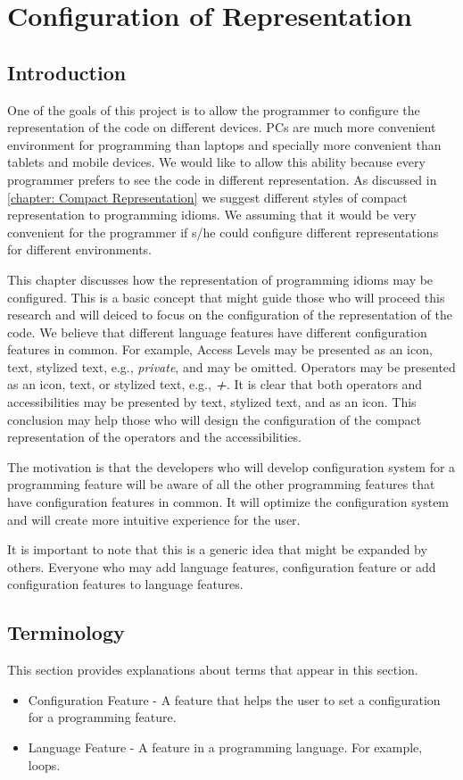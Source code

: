 \chapter{Configuration of Representation} \label{chapter:Configuration of Representation}
\section{Introduction}
One of the goals of this project is to allow the programmer to configure the representation of the code on different devices. PCs are much more convenient environment for programming than laptops and specially more convenient than tablets and mobile devices. We would like to allow this ability because every programmer prefers to see the code in different representation. As discussed in \autoref{chapter: Compact Representation} we suggest different styles of compact representation to programming idioms. We assuming that it would be very convenient for the programmer if s/he could configure different representations for different environments.

This chapter discusses how the representation of programming idioms may be configured. This is a basic concept that might guide those who will proceed this research and will deiced to focus on the configuration of the representation of the code. We believe that different language features have different configuration features in common. For example, Access Levels may be presented as an icon, text, stylized text, e.g., \textit{private}, and may be omitted. Operators may be presented as an icon, text, or stylized text, e.g., \textbf{\textit{+}}. It is clear that both operators and accessibilities may be presented by text, stylized text, and as an icon. This conclusion may help those who will design the configuration of the compact representation of the operators and the accessibilities. 

The motivation is that the developers who will develop configuration system for a programming feature will be aware of all the other programming features that have configuration features in common. It will optimize the configuration system and will create more intuitive experience for the user.

It is important to note that this is a generic idea that might be expanded by others. Everyone who may add language features, configuration feature or add configuration features to language features.
\section{Terminology}
This section provides explanations about terms that appear in this section.
\begin{itemize}
	\item Configuration Feature - A feature that helps the user to set a configuration for a programming feature.
	\item Language Feature - A feature in a programming language. For example, loops.
\end{itemize}
